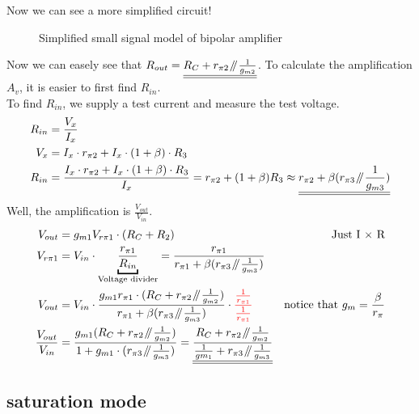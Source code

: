 \documentclass[11ypt]{extarticle}
\newcommand{\parallelEE}{\mathbin{\!/\mkern-5mu/\!}} %
\begin{document}
Now we can see a more simplified circuit!

\begin{figure}[H]{}
\centering

\caption{Simplified small signal model of bipolar amplifier}
\end{figure}

Now we can easely see that $R_{out} = \underline{\underline{R_C + r_{\pi 2} \parallelEE \frac{1}{g_{m2}}}}$.
To calculate the amplification $A_v$, it is easier to first find $R_{in}$.
\\
To find $R_{in}$, we supply a test current and measure the test voltage.
\begin{equation}
    \begin{aligned}
        R_{in} &= \frac{V_x}{I_x} \\
        V_x &= I_x \cdot r_{\pi 2} + I_x \cdot (1 + \beta) \cdot R_3 \\
        R_{in} &= \frac{I_x \cdot r_{\pi 2} + I_x \cdot (1 + \beta) \cdot R_3}{I_x} = {r_{\pi 2} + (1 + \beta) R_3} \approx \underline{\underline{{r_{\pi 2} + \beta (r_{\pi 3} \parallelEE \frac{1}{g_{m3}})}}}
       \end{aligned}
\end{equation}
Well, the amplification is $\frac{V_{out}}{V_{in}}$.
\begin{equation}
    \begin{aligned}
        V_{out} &= g_{m1}V_{r \pi 1} \cdot (R_C + R_2) &\text{Just I $\times$ R} \\
        V_{r \pi 1} &= V_{in} \cdot \underbracket{\frac{r_{\pi 1}}{R_{in}}}_\text{Voltage divider} = \frac{r_{\pi 1}}{r_{\pi 1} + \beta (r_{\pi 3} \parallelEE \frac{1}{g_{m3}})}\\
        V_{out} &= V_{in} \cdot \frac{g_{m1} r_{\pi 1} \cdot (R_C + r_{\pi 2} \parallelEE \frac{1}{g_{m 2}})}{r_{\pi 1} + \beta (r_{\pi 3} \parallelEE \frac{1}{g_{m 3}})} \cdot \color{red} \frac{\frac{1}{r_{\pi 1}}}{\frac{1}{r_{\pi 1}}} &\text{notice that $g_m = \frac{\beta}{r_\pi}$} \\
        \frac{V_{out}}{V_{in}} &= \frac{g_{m1}(R_C + r_{\pi 2} \parallelEE \frac{1}{g_{m2}})}{1 + g_{m1} \cdot (r_{\pi 3} \parallelEE \frac{1}{g_{m3}})} = \underline{\underline{\frac{R_C + r_{\pi 2} \parallelEE \frac{1}{g_{m2}}}{\frac{1}{gm_1} + r_{\pi 3} \parallelEE \frac{1}{g_{m 3}}}}}  
        \end{aligned}
\end{equation}

\subsection{saturation mode}
\end{document}

